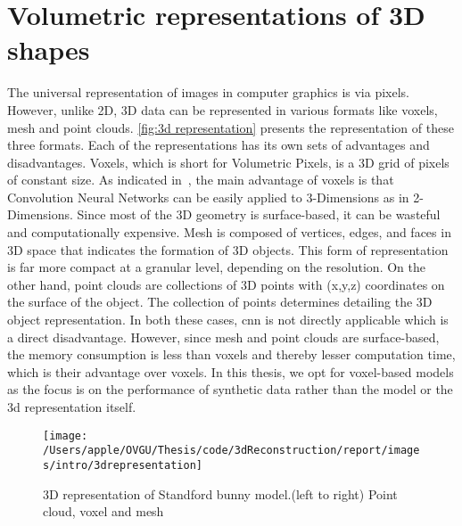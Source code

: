 \section{Volumetric representations of 3D shapes} \label{sec:Volumetric representation}
The universal representation of images in computer graphics is via pixels.
However, unlike 2D, 3D data can be represented in various formats like voxels, mesh and point clouds.
\autoref{fig:3d representation} presents the representation of these three formats.
Each of the representations has its own sets of advantages and disadvantages.
Voxels, which is short for Volumetric Pixels, is a 3D grid of pixels of constant size.
As indicated in~\cite{li2016fpnn}, the main advantage of voxels is that Convolution Neural Networks can be easily applied to 3-Dimensions as in 2-Dimensions.
Since most of the 3D geometry is surface-based, it can be wasteful and computationally expensive.
Mesh is composed of vertices, edges, and faces in 3D space that indicates the formation of 3D objects.
This form of representation is far more compact at a granular level, depending on the resolution.
On the other hand, point clouds are collections of 3D points with (x,y,z) coordinates on the surface of the object.
The collection of points determines detailing the 3D object representation.
In both these cases, \gls{cnn} is not directly applicable which is a direct disadvantage.
However, since mesh and point clouds are surface-based, the memory consumption is less than voxels and thereby lesser computation time, which is their advantage over voxels.
In this thesis, we opt for voxel-based models as the focus is on the performance of synthetic data rather than the model or the 3d representation itself.

\begin{figure}
    \centering
    \texttt{[image: /Users/apple/OVGU/Thesis/code/3dReconstruction/report/images/intro/3drepresentation]}
    \caption{3D representation of Standford bunny model.(left to right) Point cloud, voxel and mesh~\cite{Hoang2019ADL}
    \label{fig:3d representation}}
\end{figure}

